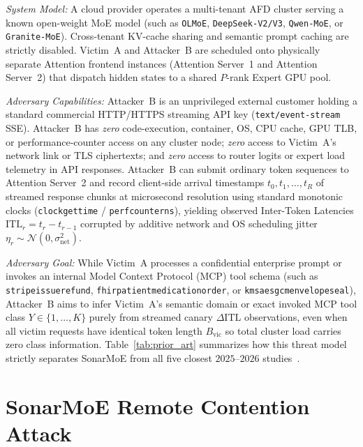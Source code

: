 \documentclass[11pt,a4paper]{article}
\renewcommand{\_}{\textunderscore\allowbreak}
\def\SM{SonarMoE}%
\theoremstyle{definition}
\theoremstyle{remark}
\newcommand{\SM}{\textsc{SonarMoE}}
\begin{document}
\emph{System Model:} A cloud provider operates a multi-tenant AFD cluster serving a known open-weight MoE model (such as \texttt{OLMoE}, \texttt{DeepSeek-V2/V3}, \texttt{Qwen-MoE}, or \texttt{Granite-MoE}). Cross-tenant KV-cache sharing and semantic prompt caching are strictly disabled. Victim~A and Attacker~B are scheduled onto physically separate Attention frontend instances (Attention Server~1 and Attention Server~2) that dispatch hidden states to a shared $P$-rank Expert GPU pool.

\emph{Adversary Capabilities:} Attacker~B is an unprivileged external customer holding a standard commercial HTTP/HTTPS streaming API key (\texttt{text/event-stream} SSE). Attacker~B has \emph{zero} code-execution, container, OS, CPU cache, GPU TLB, or performance-counter access on any cluster node; \emph{zero} access to Victim~A's network link or TLS ciphertexts; and \emph{zero} access to router logits or expert load telemetry in API responses. Attacker~B can submit ordinary token sequences to Attention Server~2 and record client-side arrival timestamps $t_0, t_1, \dots, t_R$ of streamed response chunks at microsecond resolution using standard monotonic clocks (\texttt{clock\_gettime} / \texttt{perf\_counter\_ns}), yielding observed Inter-Token Latencies $\mathrm{ITL}_r = t_r - t_{r-1}$ corrupted by additive network and OS scheduling jitter $\eta_r \sim \mathcal{N}(0, \sigma_{\mathrm{net}}^2)$.

\emph{Adversary Goal:} While Victim~A processes a confidential enterprise prompt or invokes an internal Model Context Protocol (MCP) tool schema (such as \texttt{stripe\_issue\_refund}, \texttt{fhir\_patient\_medication\_order}, or \texttt{kms\_aes\_gcm\_envelope\_seal}), Attacker~B aims to infer Victim~A's semantic domain or exact invoked MCP tool class $Y \in \{1, \dots, K\}$ purely from streamed canary $\Delta\mathrm{ITL}$ observations, even when all victim requests have identical token length $B_{\mathrm{vic}}$ so total cluster load carries zero class information. Table~\ref{tab:prior_art} summarizes how this threat model strictly separates \SM{} from all five closest $2025$--$2026$ studies~\cite{wu2025promptpeek,zheng2025inputsnatch,microsoft2025whisperleak,ding2025moecho,patel2026routingmembership,liu2026straggler}.

\section{SonarMoE Remote Contention Attack}\label{sec:attack}
\end{document}
